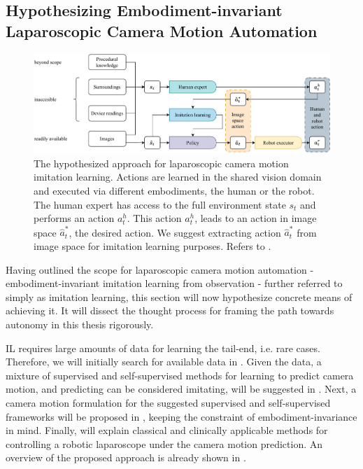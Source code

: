 \subsection{Hypothesizing Embodiment-invariant Laparoscopic Camera Motion Automation}
\label{in:sec:hypothesizing}
\begin{figure}[tb]
    \centering
    \includegraphics[width=\textwidth]{introduction/fig/camera_motion_action.pdf}
    \caption{The hypothesized approach for laparoscopic camera motion imitation learning. Actions are learned in the shared vision domain and executed via different embodiments, the human or the robot. The human expert has access to the full environment state $s_t$ and performs an action $a^h_t$. This action $a^h_t$, leads to an action in image space $\hat{a}^*_t$, the desired action. We suggest extracting action $\hat{a}^*_t$ from image space for imitation learning purposes. Refers to .}
    \label{in:fig:hypothesized_pipeline}
\end{figure}
Having outlined the scope for laparoscopic camera motion automation - embodiment-invariant imitation learning from observation - further referred to simply as imitation learning, this section will now hypothesize concrete means of achieving it. It will dissect the thought process for framing the path towards autonomy in this thesis rigorously.

IL requires large amounts of data for learning the tail-end, i.e. rare cases. Therefore, we will initially search for available data in . Given the data, a mixture of supervised and self-supervised methods for learning to predict camera motion, and predicting can be considered imitating, will be suggested in . Next, a camera motion formulation for the suggested supervised and self-supervised frameworks will be proposed in , keeping the constraint of embodiment-invariance in mind. Finally,  will explain classical and clinically applicable methods for controlling a robotic laparoscope under the camera motion prediction.  An overview of the proposed approach is already shown in .


